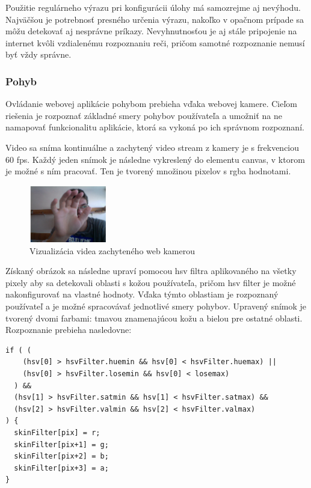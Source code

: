 Použitie regulárneho výrazu pri konfigurácii úlohy má samozrejme aj nevýhodu. Najväčšou je potrebnosť presného určenia výrazu, nakoľko v opačnom prípade sa môžu detekovať aj nesprávne príkazy. Nevyhnutnosťou je aj stále pripojenie na internet kvôli vzdialenému rozpoznaniu reči, pričom samotné rozpoznanie nemusí byť vždy správne.


\subsubsection{Pohyb} %
\label{ssub:pohyb}

Ovládanie webovej aplikácie pohybom prebieha vďaka webovej kamere. Cieľom riešenia je rozpoznať základné smery pohybov používateľa a umožniť na ne namapovať funkcionalitu aplikácie, ktorá sa vykoná po ich správnom rozpoznaní. 

Video sa sníma kontinuálne a zachytený video stream z kamery je s frekvenciou 60 fps. Každý jeden snímok je následne vykreslený do elementu canvas, v ktorom je možné s ním pracovať. Ten je tvorený množinou pixelov s rgba hodnotami.

\begin{figure}[H]
  \centering
  \includegraphics[width=0.3\textwidth]{img/motion/video.png}
  \caption[Vizualizácia videa zachyteného web kamerou]{
    Vizualizácia videa zachyteného web kamerou}
  \label{fig: motion-video}
\end{figure}

Získaný obrázok sa následne upraví pomocou hsv filtra aplikovaného na všetky pixely aby sa detekovali oblasti s kožou používateľa, pričom hsv filter je možné nakonfigurovať na vlastné hodnoty. Vďaka týmto oblastiam je rozpoznaný používateľ a je možné spracovávať jednotlivé smery pohybov. Upravený snímok je tvorený dvomi farbami: tmavou znamenajúcou kožu a bielou pre ostatné oblasti. Rozpoznanie prebieha nasledovne:

\begin{lstlisting}
if ( (
    (hsv[0] > hsvFilter.huemin && hsv[0] < hsvFilter.huemax) || 
    (hsv[0] > hsvFilter.losemin && hsv[0] < losemax)
  ) && 
  (hsv[1] > hsvFilter.satmin && hsv[1] < hsvFilter.satmax) &&
  (hsv[2] > hsvFilter.valmin && hsv[2] < hsvFilter.valmax)
) {
  skinFilter[pix] = r;
  skinFilter[pix+1] = g;
  skinFilter[pix+2] = b;
  skinFilter[pix+3] = a;
}
\end{lstlisting}

